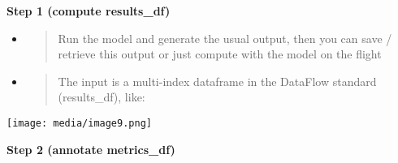 \documentclass[11pt, reqno]{amsart}
\begin{document}
\textbf{Step 1 (compute results\_df)}

\begin{itemize}
\item
  \begin{quote}
  Run the model and generate the usual output, then you can save /
  retrieve this output or just compute with the model on the flight
  \end{quote}
\end{itemize}

\begin{itemize}
\item
  \begin{quote}
  The input is a multi-index dataframe in the DataFlow standard
  (results\_df), like:
  \end{quote}
\end{itemize}

\texttt{[image: media/image9.png]}

\textbf{Step 2 (annotate metrics\_df)}
\end{document}
